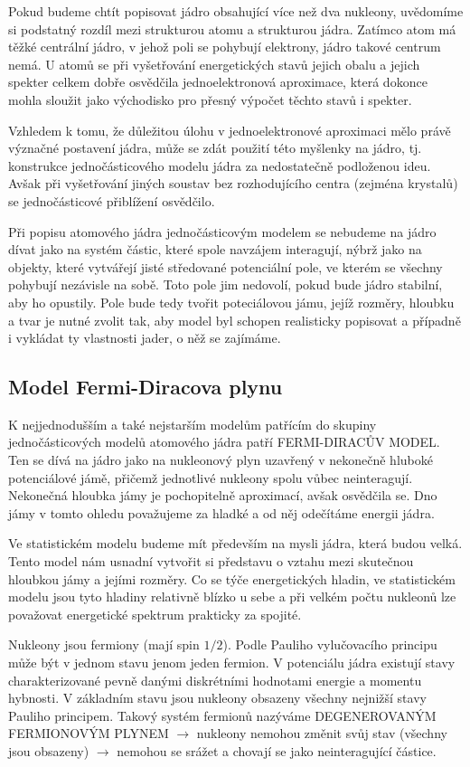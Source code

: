 \documentclass[../../main.tex]{subfiles}
\begin{document}
Pokud budeme chtít popisovat jádro obsahující více než dva nukleony, uvědomíme si podstatný rozdíl mezi strukturou atomu a strukturou jádra. Zatímco atom má těžké centrální jádro, v jehož poli se pohybují elektrony, jádro takové centrum nemá. U atomů se při vyšetřování energetických stavů jejich obalu a jejich spekter celkem dobře osvědčila jednoelektronová aproximace, která dokonce mohla sloužit jako východisko pro přesný výpočet těchto stavů i spekter. 

Vzhledem k tomu, že důležitou úlohu v jednoelektronové aproximaci mělo právě význačné postavení jádra, může se zdát použití této myšlenky na jádro, tj. konstrukce jednočásticového modelu jádra za nedostatečně podloženou ideu. Avšak při vyšetřování jiných soustav bez rozhodujícího centra (zejména krystalů) se jednočásticové přiblížení osvědčilo.

Při popisu atomového jádra jednočásticovým modelem se nebudeme na jádro dívat jako na systém částic, které spole navzájem interagují, nýbrž jako na objekty, které vytvářejí jisté středované potenciální pole, ve kterém se všechny pohybují nezávisle na sobě. Toto pole jim nedovolí, pokud bude jádro stabilní, aby ho opustily. Pole bude tedy tvořit poteciálovou jámu, jejíž rozměry, hloubku a tvar je nutné zvolit tak, aby model byl schopen realisticky popisovat a případně i vykládat ty vlastnosti jader, o něž se zajímáme.

\subsection{Model Fermi-Diracova plynu}

K nejjednodušším a také nejstarším modelům patřícím do skupiny jednočásticových modelů atomového jádra patří FERMI-DIRACŮV MODEL. Ten se dívá na jádro jako na nukleonový plyn uzavřený v nekonečně hluboké potenciálové jámě, přičemž jednotlivé nukleony spolu vůbec neinteragují. Nekonečná hloubka jámy je pochopitelně aproximací, avšak osvědčila se. Dno jámy v tomto ohledu považujeme za hladké a od něj odečítáme energii jádra.

Ve statistickém modelu budeme mít především na mysli jádra, která budou velká. Tento model nám usnadní vytvořit si představu o vztahu mezi skutečnou hloubkou jámy a jejími rozměry. Co se týče energetických hladin, ve statistickém modelu jsou tyto hladiny relativně blízko u sebe a při velkém počtu nukleonů lze považovat energetické spektrum prakticky za spojité.

Nukleony jsou fermiony (mají spin $1/2$). Podle Pauliho vylučovacího principu může být v jednom stavu jenom jeden fermion. V potenciálu jádra existují stavy charakterizované pevně danými diskrétními hodnotami energie a momentu hybnosti. V základním stavu jsou nukleony obsazeny všechny nejnižší stavy Pauliho principem. Takový systém fermionů nazýváme DEGENEROVANÝM FERMIONOVÝM PLYNEM $\rightarrow$ nukleony nemohou změnit svůj stav (všechny jsou obsazeny) $\rightarrow$ nemohou se srážet a chovají se jako neinteragující částice.
\end{document}
